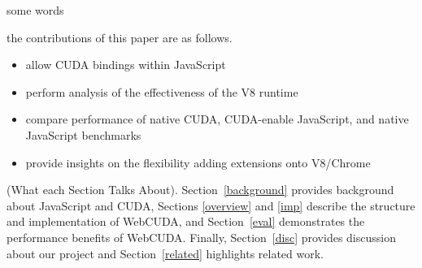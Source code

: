 
some words

the contributions of this paper are as follows.

\begin{itemize}

\item allow CUDA bindings within JavaScript
\item perform analysis of the effectiveness of the V8 runtime
\item compare performance of native CUDA, CUDA-enable JavaScript, and native JavaScript benchmarks
\item provide insights on the flexibility adding extensions onto V8/Chrome

\end{itemize}

(What each Section Talks About). Section~\ref{background} provides background about JavaScript and CUDA, 
Sections \ref{overview} and \ref{imp} describe the structure and implementation of WebCUDA, and
Section~\ref{eval} demonstrates the performance benefits of WebCUDA. Finally, Section~\ref{disc}
provides discussion about our project  and Section~\ref{related} highlights related work.

